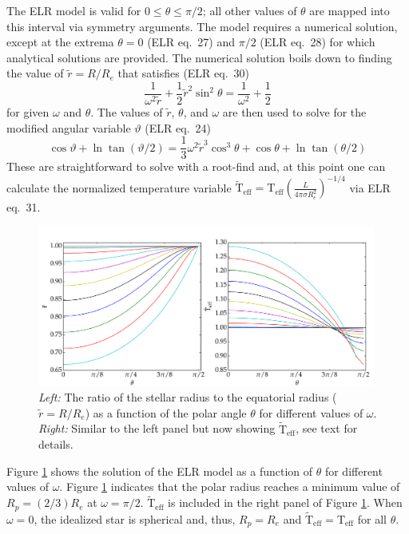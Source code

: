 \documentclass[12pt]{article}
\newcommand{\Teff}{\mathrm{T_{eff}}}
\newcommand{\twTeff}{\mathrm{\tilde{T}_{eff}}}
\begin{document}
The ELR model is valid for $0 \leq \theta \leq \pi/2$; all other values of
$\theta$ are mapped into this interval via symmetry arguments. The model
requires a numerical solution, except at the extrema $\theta = 0$ (ELR eq.\ 27)
and $\pi/2$ (ELR eq.\ 28) for which analytical solutions are provided. The
numerical solution boils down to finding the value of $\tilde{r}=R/R_e$ that
satisfies (ELR eq.\ 30)
\begin{equation}
  \frac{1}{\omega^2 \tilde{r}} + \frac{1}{2} \tilde{r}^2 \sin^2 \theta = \frac{1}{\omega^2} + \frac{1}{2}
\end{equation}
for given $\omega$ and $\theta$. The values of $\tilde{r}$, $\theta$, and $\omega$ are then used to solve for the modified angular variable $\vartheta$ (ELR eq.\ 24)
\begin{equation}
  \cos \vartheta + \ln \tan(\vartheta/2) = \frac{1}{3} \omega^2 \tilde{r}^3 \cos^3 \theta + \cos \theta + \ln \tan(\theta/2)
\end{equation}
These are straightforward to solve with a root-find and, at this point one can calculate the normalized temperature variable
\begin{math}
  \twTeff = \Teff \left( \frac{L}{4 \pi \sigma R_e^2} \right)^{-1/4}
\end{math} via ELR eq.\ 31.

\begin{figure}
  \centering
  \includegraphics[width=0.99\textwidth]{../plots/R_and_T.pdf}
  \caption{\emph{Left:} The ratio of the stellar radius to the equatorial radius ($\tilde{r}=R/R_e$) as a function of the polar angle $\theta$ for different values of $\omega$. \emph{Right:} Similar to the left panel but now showing $\twTeff$, see text for details.\label{fig:ELR}}
\end{figure}

Figure \ref{fig:ELR} shows the solution of the ELR model as a function of
$\theta$ for different values of $\omega$. Figure \ref{fig:ELR} indicates
that the polar radius reaches a minimum value of $R_p = (2/3) R_e$ at $\omega=\pi/2$.
$\twTeff$ is included in the right panel of Figure \ref{fig:ELR}. When
$\omega=0$, the idealized star is spherical and, thus, $R_p = R_e$ and $\twTeff = \Teff$ for all $\theta$.
\end{document}
